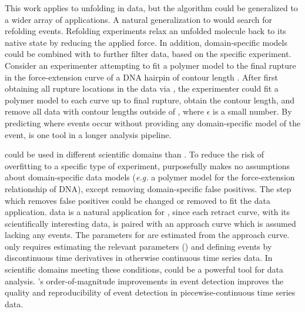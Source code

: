 This work applies \name{} to unfolding in \singlemol{} data, but the algorithm could be generalized to a wider array of applications. A natural generalization to \name{} would search for refolding events. Refolding experiments relax an unfolded molecule back to its native state by reducing the applied force. In addition, domain-specific models could be combined with \name{} to further filter data, based on the specific experiment. Consider an experimenter attempting to fit a polymer model to the final rupture in the force-extension curve of a DNA hairpin of contour length . After first obtaining all rupture locations in the data via \name{}, the experimenter could fit a polymer model to each curve up to final rupture, obtain the contour length, and remove all data with contour lengths outside of , where $\epsilon$ is a small number. By predicting where events occur without providing any domain-specific model of the event, \name{} is one tool in a longer \singlemol{} analysis pipeline.

\name{} could be used in different scientific domains than \singlemol{}. To reduce the risk of overfitting to a specific type of \singlemol{} experiment, \name{} purposefully makes no assumptions about domain-specific data models (\textit{e.g.} a polymer model for the force-extension relationship of DNA), except removing \singlemol{} domain-specific false positives. The step which removes false positives could be changed or removed to fit the data application. \singlemol{} data is a natural application for \name{}, since each retract curve, with its scientifically interesting data, is paired with an approach curve which is assumed lacking any events. The parameters for \name{} are estimated from the approach curve. \name{} only requires estimating the relevant parameters () and defining events by discontinuous time derivatives in otherwise continuous time series data. In scientific domains meeting these conditions, \name{} could be a powerful tool for data analysis.  \name{}'s order-of-magnitude improvements in event detection improves the quality and reproducibility of event detection in piecewise-continuous time series data.

